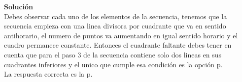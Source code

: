 \documentclass[11pt, a4paper]{article} %
\theoremstyle{dotlessP}
\theoremstyle{dotlessS}
\begin{document}
\begin{enumerate}[label=\color{dg}\theenumi.]
    \begin{figure}[h!]
       \centering
       \qquad 
		\qquad 
        		\qquad 
\end{figure}
 \textbf{Solución} \\
Debes observar cada uno de los elementos de la secuencia, tenemos que la secuencia empieza con una linea divisora por cuadrante que va en sentido  antihorario, el numero de puntos  va aumentando en igual sentido horario y el cuadro permanece constante.  Entonces el cuadrante faltante  debes tener en cuenta que para el paso 3 de la secuencia contiene solo dos lineas  en sus cuadrantes inferiores y el unico que cumple esa condición es la opción p.\\ 
{\color{dh} La respuesta correcta es la p.}
\end{enumerate}

\end{document}
